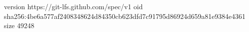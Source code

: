version https://git-lfs.github.com/spec/v1
oid sha256:4be6a577af2408348624d84350cb623dfd7c91795d86924d659a81e9384e4361
size 49248
